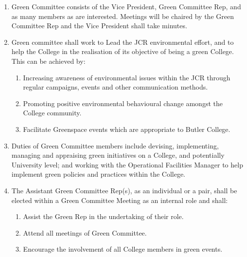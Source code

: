 \begin{enumerate}
    \item Green Committee consists of the Vice President, Green Committee Rep, and as many members as are interested. Meetings will be chaired by the Green Committee Rep and the Vice President shall take minutes.
    \item Green committee shall work to Lead the JCR environmental effort, and to help the College in the realisation of its objective of being a green College. This can be achieved by:
    \begin{enumerate}
        \item Increasing awareness of environmental issues within the JCR through regular campaigns, events and other communication methods.
        \item Promoting positive environmental behavioural change amongst the College community.
        \item Facilitate Greenspace events which are appropriate to Butler College.
    \end{enumerate}
    \item Duties of Green Committee members include devising, implementing, managing and appraising green initiatives on a College, and potentially University level; and working with the Operational Facilities Manager to help implement green policies and practices within the College.
    \item The Assistant Green Committee Rep(s), as an individual or a pair, shall be elected within a Green Committee Meeting as an internal role and shall:
    \begin{enumerate}
        \item Assist the Green Rep in the undertaking of their role.
        \item Attend all meetings of Green Committee.
        \item Encourage the involvement of all College members in green events.
    \end{enumerate}
\end{enumerate}



